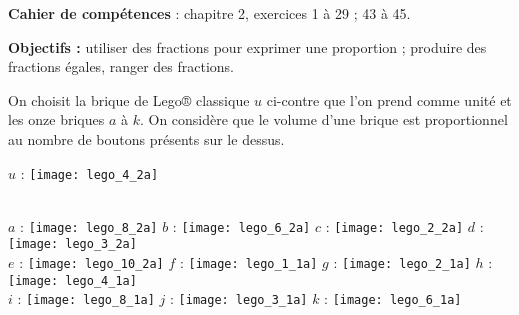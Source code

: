 \vfill

\textcolor{PartieGeometrie}{\sffamily\bfseries Cahier de compétences} : chapitre 2, exercices 1 à 29 ; 43 à 45.


\activites

\begin{activite}
   {\bf Objectifs :} utiliser des fractions pour exprimer une proportion ; produire des fractions égales, ranger des fractions. \\
   \begin{QCM}
       \medskip
         \begin{minipage}{10cm}
            On choisit la brique de Lego® classique $u$ ci-contre que l'on prend comme unité et les onze briques $a$ à $k$. On considère que le volume d'une brique est proportionnel au nombre de \og boutons \fg{} présents sur le dessus.
         \end{minipage}
         \hspace{1cm}
         \begin{minipage}{5cm}
            $u$ : \texttt{[image: lego\_4\_2a]}
         \end{minipage} \\ [10mm]
            $a$ : \texttt{[image: lego\_8\_2a]} \qquad 
            $b$ : \texttt{[image: lego\_6\_2a]} \qquad
            $c$ : \texttt{[image: lego\_2\_2a]} \qquad
            $d$ : \texttt{[image: lego\_3\_2a]} \\ [5mm]
            $e$ : \texttt{[image: lego\_10\_2a]} \qquad
            $f$ : \texttt{[image: lego\_1\_1a]} \qquad
            $g$ : \texttt{[image: lego\_2\_1a]} \qquad
            $h$ : \texttt{[image: lego\_4\_1a]} \\ [5mm]
            $i$ : \texttt{[image: lego\_8\_1a]} \qquad
            $j$ : \texttt{[image: lego\_3\_1a]} \qquad
            $k$ : \texttt{[image: lego\_6\_1a]} \\
            

\end{QCM}
\end{activite}
